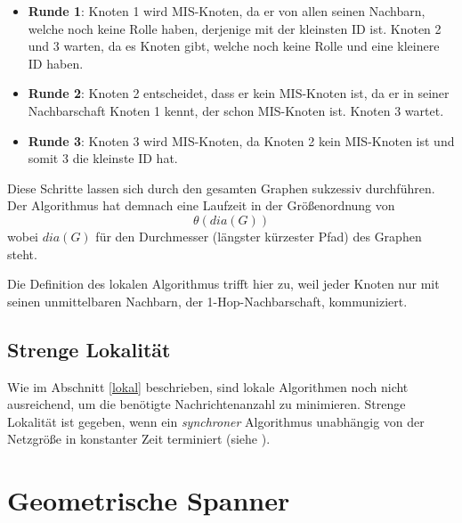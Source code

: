 \documentclass[a4paper,twoside]{IEEEtran}
\begin{document}
\begin{itemize}
\item \textbf{Runde 1}: Knoten 1 wird MIS-Knoten, da er von allen seinen Nachbarn, welche noch keine Rolle haben, derjenige mit der kleinsten ID ist. Knoten 2 und 3 warten, da es Knoten gibt, welche noch keine Rolle und eine kleinere ID haben.

\item \textbf{Runde 2}: Knoten 2 entscheidet, dass er kein MIS-Knoten ist, da er in seiner Nachbarschaft Knoten 1 kennt, der schon MIS-Knoten ist. Knoten 3 wartet.

\item \textbf{Runde 3}: Knoten 3 wird MIS-Knoten, da Knoten 2 kein MIS-Knoten ist und somit 3 die kleinste ID hat. 
\end{itemize}

Diese Schritte lassen sich durch den gesamten Graphen sukzessiv durchführen. 
Der Algorithmus hat demnach eine Laufzeit in der Größenordnung von 
\begin{equation*}
\theta (dia(G)) 
\end{equation*}
wobei $dia(G) $ für den Durchmesser (längster kürzester Pfad) des Graphen steht.

Die Definition des lokalen Algorithmus trifft hier zu, weil jeder Knoten nur mit seinen unmittelbaren Nachbarn, der 1-Hop-Nachbarschaft, kommuniziert.





\subsection{Strenge Lokalität}
Wie im Abschnitt \ref{lokal} beschrieben, sind lokale Algorithmen noch nicht ausreichend, um die benötigte Nachrichtenanzahl zu minimieren.
Strenge Lokalität ist gegeben, wenn ein \emph{synchroner} Algorithmus unabhängig von der Netzgröße in konstanter Zeit terminiert (siehe \cite{strictlyLocal}).




\section{Geometrische Spanner}
\end{document}
